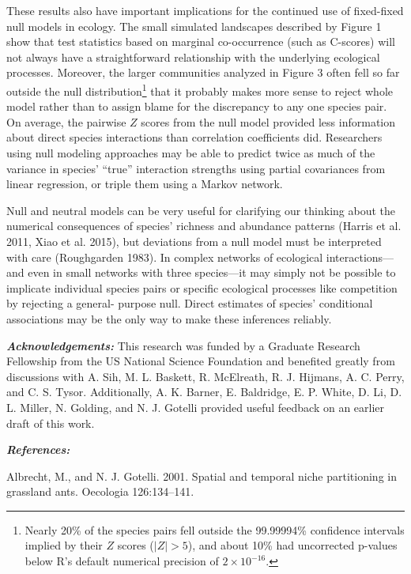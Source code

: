 \documentclass[12pt,]{article}
\begin{document}
\begin{spacing}{1.9}
\begin{flushleft}
These results also have important implications for the continued use of
fixed-fixed null models in ecology. The small simulated landscapes
described by Figure 1 show that test statistics based on marginal
co-occurrence (such as C-scores) will not always have a straightforward
relationship with the underlying ecological processes. Moreover, the
larger communities analyzed in Figure 3 often fell so far outside the
null distribution\footnote{Nearly 20\% of the species pairs fell outside
  the 99.99994\% confidence intervals implied by their \(Z\) scores
  (\(|Z| > 5\)), and about 10\% had uncorrected p-values below R's
  default numerical precision of \(2 \times 10^{-16}\).} that it
probably makes more sense to reject whole model rather than to assign
blame for the discrepancy to any one species pair. On average, the
pairwise \(Z\) scores from the null model provided less information
about direct species interactions than correlation coefficients did.
Researchers using null modeling approaches may be able to predict twice
as much of the variance in species' ``true'' interaction strengths using
partial covariances from linear regression, or triple them using a
Markov network.

Null and neutral models can be very useful for clarifying our thinking
about the numerical consequences of species' richness and abundance
patterns (Harris et al. 2011, Xiao et al. 2015), but deviations from a
null model must be interpreted with care (Roughgarden 1983). In complex
networks of ecological interactions---and even in small networks with
three species---it may simply not be possible to implicate individual
species pairs or specific ecological processes like competition by
rejecting a general- purpose null. Direct estimates of species'
conditional associations may be the only way to make these inferences
reliably.

\textbf{\emph{Acknowledgements:}} This research was funded by a Graduate
Research Fellowship from the US National Science Foundation and
benefited greatly from discussions with A. Sih, M. L. Baskett, R.
McElreath, R. J. Hijmans, A. C. Perry, and C. S. Tysor. Additionally, A.
K. Barner, E. Baldridge, E. P. White, D. Li, D. L. Miller, N. Golding,
and N. J. Gotelli provided useful feedback on an earlier draft of this
work.

\textbf{\emph{References:}}

Albrecht, M., and N. J. Gotelli. 2001. Spatial and temporal niche
partitioning in grassland ants. Oecologia 126:134--141.


\end{flushleft}
\end{spacing}
\end{document}
